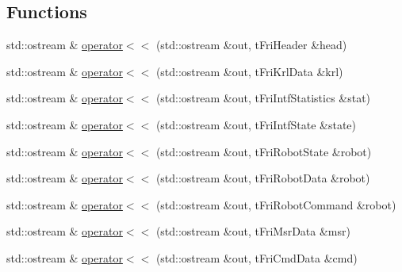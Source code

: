 \subsection*{\-Functions}
\begin{DoxyCompactItemize}
\item 
std\-::ostream \& \hyperlink{group__friRemoteLib_gaf72fca402538226897836d956e87eb34}{operator$<$$<$} (std\-::ostream \&out, t\-Fri\-Header \&head)
\item 
std\-::ostream \& \hyperlink{group__friRemoteLib_ga2084b57d3749dec752a73be26dd63181}{operator$<$$<$} (std\-::ostream \&out, t\-Fri\-Krl\-Data \&krl)
\item 
std\-::ostream \& \hyperlink{group__friRemoteLib_ga6805b4bdbc1d292cc71e90c52dd50d9b}{operator$<$$<$} (std\-::ostream \&out, t\-Fri\-Intf\-Statistics \&stat)
\item 
std\-::ostream \& \hyperlink{group__friRemoteLib_ga69b68750c2eb57b773e27c2d3a1f153e}{operator$<$$<$} (std\-::ostream \&out, t\-Fri\-Intf\-State \&state)
\item 
std\-::ostream \& \hyperlink{group__friRemoteLib_ga05dbbd234411503481ee3e0ad5b7c63a}{operator$<$$<$} (std\-::ostream \&out, t\-Fri\-Robot\-State \&robot)
\item 
std\-::ostream \& \hyperlink{group__friRemoteLib_gab0492ddd68270ac40087963414125fec}{operator$<$$<$} (std\-::ostream \&out, t\-Fri\-Robot\-Data \&robot)
\item 
std\-::ostream \& \hyperlink{group__friRemoteLib_ga0333a9c3556aa2c9f899590a72b67cca}{operator$<$$<$} (std\-::ostream \&out, t\-Fri\-Robot\-Command \&robot)
\item 
std\-::ostream \& \hyperlink{group__friRemoteLib_ga14dbb577d03e926f946081c03a02b169}{operator$<$$<$} (std\-::ostream \&out, t\-Fri\-Msr\-Data \&msr)
\item 
std\-::ostream \& \hyperlink{group__friRemoteLib_ga99d34ffb90bb4b380896954be74baa84}{operator$<$$<$} (std\-::ostream \&out, t\-Fri\-Cmd\-Data \&cmd)
\end{DoxyCompactItemize}


